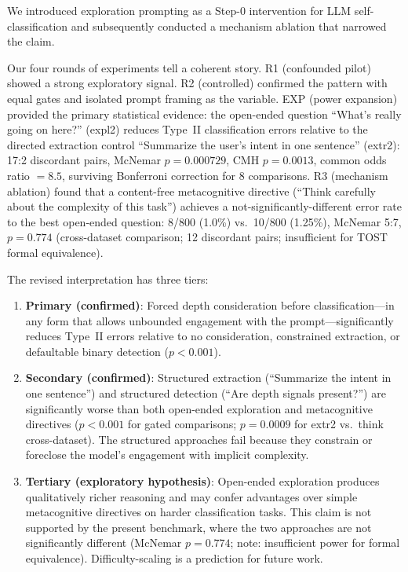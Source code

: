 \documentclass[11pt,a4paper]{article}
\begin{document}
We introduced exploration prompting as a Step-0 intervention for LLM
self-classification and subsequently conducted a mechanism ablation that
narrowed the claim.

Our four rounds of experiments tell a coherent story.  R1 (confounded pilot)
showed a strong exploratory signal.  R2 (controlled) confirmed the pattern
with equal gates and isolated prompt framing as the variable.  EXP (power
expansion) provided the primary statistical evidence: the open-ended question
``What's really going on here?'' (\textsf{expl2}) reduces Type~II
classification errors relative to the directed extraction control
``Summarize the user's intent in one sentence'' (\textsf{extr2}): 17:2
discordant pairs, McNemar $p = 0.000729$, CMH $p = 0.0013$, common odds
ratio $= 8.5$, surviving Bonferroni correction for 8 comparisons.  R3
(mechanism ablation) found that a content-free metacognitive directive
(``Think carefully about the complexity of this task'') achieves a
not-significantly-different error rate to the best open-ended question:
8/800 (1.0\%) vs.\ 10/800 (1.25\%), McNemar 5:7, $p = 0.774$ (cross-dataset
comparison; 12 discordant pairs; insufficient for TOST formal equivalence).

The revised interpretation has three tiers:

\begin{enumerate}
  \item \textbf{Primary (confirmed)}: Forced depth consideration before
    classification---in any form that allows unbounded engagement with the
    prompt---significantly reduces Type~II errors relative to no
    consideration, constrained extraction, or defaultable binary detection
    ($p < 0.001$).

  \item \textbf{Secondary (confirmed)}: Structured extraction
    (``Summarize the intent in one sentence'') and structured detection
    (``Are depth signals present?'') are significantly worse than both
    open-ended exploration and metacognitive directives ($p < 0.001$
    for gated comparisons; $p = 0.0009$ for extr2 vs.\ think
    cross-dataset).  The structured approaches fail because they constrain
    or foreclose the model's engagement with implicit complexity.

  \item \textbf{Tertiary (exploratory hypothesis)}: Open-ended exploration
    produces qualitatively richer reasoning and may confer advantages over
    simple metacognitive directives on harder classification tasks.  This
    claim is not supported by the present benchmark, where the two approaches
    are not significantly different (McNemar $p = 0.774$; note: insufficient
    power for formal equivalence).  Difficulty-scaling is a prediction for
    future work.
\end{enumerate}
\end{document}
